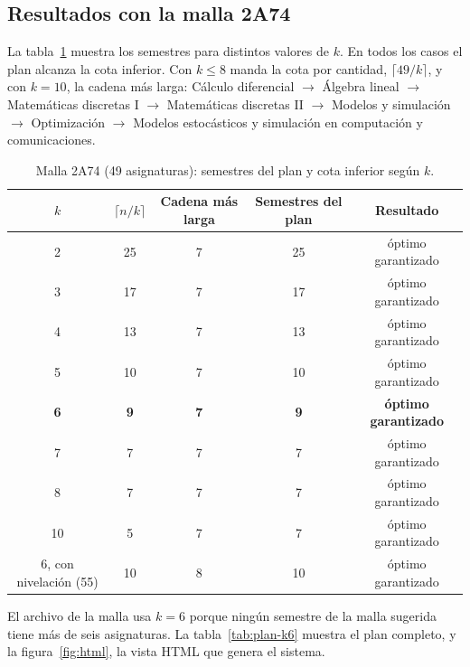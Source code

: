 \documentclass[11pt,letterpaper]{article}
\begin{document}
\subsection{Resultados con la malla 2A74}
La tabla~\ref{tab:malla-k} muestra los semestres para distintos valores de $k$. En todos los casos el plan alcanza la cota inferior. Con $k \leq 8$ manda la cota por cantidad, $\lceil 49/k \rceil$, y con $k = 10$, la cadena más larga: Cálculo diferencial $\to$ Álgebra lineal $\to$ Matemáticas discretas I $\to$ Matemáticas discretas II $\to$ Modelos y simulación $\to$ Optimización $\to$ Modelos estocásticos y simulación en computación y comunicaciones.

\begin{table}[H]
\centering
\small
\caption{Malla 2A74 (49 asignaturas): semestres del plan y cota inferior según $k$.}
\label{tab:malla-k}
\begin{tabular}{@{}c c c c c@{}}
\toprule
$k$ & $\lceil n/k \rceil$ & Cadena más larga & Semestres del plan & Resultado \\
\midrule
2 & 25 & 7 & 25 & óptimo garantizado \\
3 & 17 & 7 & 17 & óptimo garantizado \\
4 & 13 & 7 & 13 & óptimo garantizado \\
5 & 10 & 7 & 10 & óptimo garantizado \\
\textbf{6} & \textbf{9} & \textbf{7} & \textbf{9} & \textbf{óptimo garantizado} \\
7 & 7 & 7 & 7 & óptimo garantizado \\
8 & 7 & 7 & 7 & óptimo garantizado \\
10 & 5 & 7 & 7 & óptimo garantizado \\
\midrule
6, con nivelación (55) & 10 & 8 & 10 & óptimo garantizado \\
\bottomrule
\end{tabular}
\end{table}

El archivo de la malla usa $k = 6$ porque ningún semestre de la malla sugerida tiene más de seis asignaturas. La tabla~\ref{tab:plan-k6} muestra el plan completo, y la figura~\ref{fig:html}, la vista HTML que genera el sistema.
\end{document}
